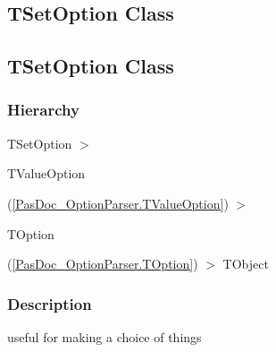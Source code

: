 \documentclass{report}
\begin{document}
\subsection*{\large{\textbf{TSetOption Class}}\normalsize\hspace{1ex}\hrulefill}
\else
\subsection*{TSetOption Class}
\fi
\label{PasDoc_OptionParser.TSetOption}
\subsubsection*{\large{\textbf{Hierarchy}}\normalsize\hspace{1ex}\hfill}
TSetOption {$>$} \begin{ttfamily}TValueOption\end{ttfamily}(\ref{PasDoc_OptionParser.TValueOption}) {$>$} \begin{ttfamily}TOption\end{ttfamily}(\ref{PasDoc_OptionParser.TOption}) {$>$} 
TObject
\subsubsection*{\large{\textbf{Description}}\normalsize\hspace{1ex}\hfill}
useful for making a choice of things\hfill\vspace*{1ex}
\end{document}
